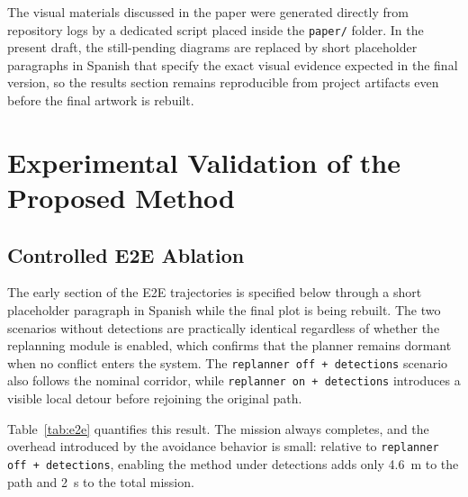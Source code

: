 \documentclass[journal,twoside,web]{ieeecolor}
\begin{document}
The visual materials discussed in the paper were generated directly from repository logs by a dedicated script placed inside the \texttt{paper/} folder. In the present draft, the still-pending diagrams are replaced by short placeholder paragraphs in Spanish that specify the exact visual evidence expected in the final version, so the results section remains reproducible from project artifacts even before the final artwork is rebuilt.

\section{Experimental Validation of the Proposed Method}

\subsection{Controlled E2E Ablation}

The early section of the E2E trajectories is specified below through a short placeholder paragraph in Spanish while the final plot is being rebuilt. The two scenarios without detections are practically identical regardless of whether the replanning module is enabled, which confirms that the planner remains dormant when no conflict enters the system. The \texttt{replanner off + detections} scenario also follows the nominal corridor, while \texttt{replanner on + detections} introduces a visible local detour before rejoining the original path.


Table~\ref{tab:e2e} quantifies this result. The mission always completes, and the overhead introduced by the avoidance behavior is small: relative to \texttt{replanner off + detections}, enabling the method under detections adds only \SI{4.6}{\meter} to the path and \SI{2}{\second} to the total mission.
\end{document}
